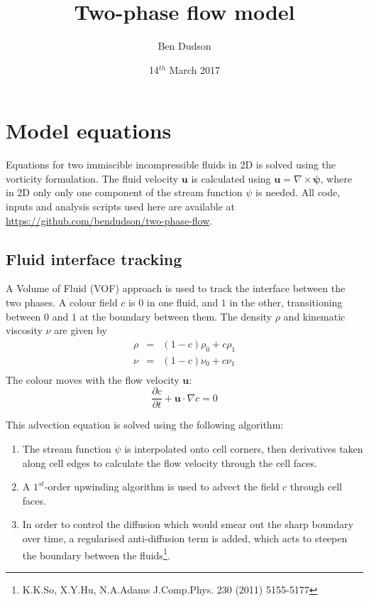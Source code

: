 \documentclass[12pt,a4paper]{article}
\title{ Two-phase flow model }%
\author{ Ben Dudson }%
\date{ 14$^{th}$ March 2017 }%
\begin{document}
\maketitle %
\thispagestyle{fancy}%

\section{Model equations}

Equations for two immiscible incompressible fluids in 2D is solved using the vorticity formulation. The fluid velocity $\mathbf{u}$ is calculated using $\mathbf{u} = \nabla\times\mathbf{\psi}$, where in 2D only only one component of the stream function $\psi$ is needed. All code, inputs and analysis scripts used here are available at \url{https://github.com/bendudson/two-phase-flow}.

\subsection{Fluid interface tracking}

A Volume of Fluid (VOF) approach is used to track the interface between the two phases. A colour field $c$ is $0$ in one fluid, and $1$ in the other, transitioning between $0$ and $1$ at the boundary between them. The density $\rho$ and kinematic viscosity $\nu$ are given by
\begin{eqnarray}
\rho &=& \left(1-c\right)\rho_0 + c \rho_1 \\
\nu &=& \left(1-c\right)\nu_0 + c \nu_1 \\
\end{eqnarray}
The colour moves with the flow velocity $\mathbf{u}$:
\begin{equation}
\frac{\partial c}{\partial t} + \mathbf{u}\cdot\nabla c = 0
\end{equation}

This advection equation is solved using the following algorithm:
\begin{enumerate}
\item The stream function $\psi$ is interpolated onto cell corners, then derivatives taken along cell edges to calculate the flow
velocity through the cell faces.
\item A $1^{st}$-order upwinding algorithm is used to advect
  the field $c$ through cell faces.
\item In order to control the diffusion which would smear out
  the sharp boundary over time, a regularised anti-diffusion
  term is added, which acts to steepen the boundary between the
  fluids\footnote{K.K.So, X.Y.Hu, N.A.Adams J.Comp.Phys. 230 (2011) 5155-5177}. 
\end{enumerate}
\end{document}
